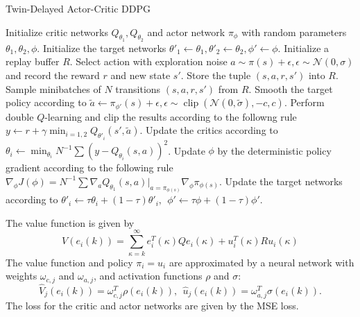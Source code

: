 \documentclass[landscape,a0paper,fontscale=0.292]{baposter}
\DeclareMathOperator{\Clip}{clip}
\begin{document}
\begin{poster}
{
	\begin{algorithm}[H]
		\caption{Twin-Delayed Actor-Critic DDPG}
		\begin{algorithmic}[1]
			\STATE Initialize critic networks $Q_{\theta_1}, Q_{\theta_2}$ and actor network $\pi_{\phi}$ with random parameters
			$\theta_1, \theta_2, \phi$. 
			\STATE Initialize the target networks $\theta'_1 \leftarrow \theta_1, \theta'_2 \leftarrow \theta_2, \phi' \leftarrow \phi$.
			\STATE Initialize a replay buffer $R$.
				\STATE Select action with exploration noise $a \sim \pi(s) + \epsilon, \epsilon \sim \mathcal{N}(0, \sigma)$ and record the reward $r$ and new state $s'$. 
				\STATE Store the tuple $(s, a, r, s')$ into $R$. 
				\STATE Sample minibatches of $N$ transitions $(s, a, r, s')$ from $R$.
				\STATE Smooth the target policy according to $\tilde{a} \leftarrow \pi_{\phi'}(s) + \epsilon, \epsilon \sim \Clip(\mathcal{N}(0, \tilde{\sigma}), -c, c)$.
				\STATE Perform double $Q$-learning and clip the results according to the followng rule $y \leftarrow r + \gamma \min_{i=1,2}Q_{\theta'_i}(s', \tilde{a})$. 
				\STATE Update the critics according to $\theta_i \leftarrow \min_{\theta_i}N^{-1}\sum(y - Q_{\theta_i}(s, a))^2$.
					\STATE Update $\phi$ by the deterministic policy gradient according to the following rule $\nabla_{\phi}J(\phi) = N^{-1}\sum\nabla_a Q_{\theta_1}(s,a)\big|_{a = \pi_{\phi(s)}}\nabla_{\phi}\pi_{\phi(s)}$.
					\STATE Update the target networks according to $\theta'_i \leftarrow \tau\theta_i + (1-\tau)\theta'_i, \:\: \phi' \leftarrow \tau\phi + (1-\tau)\phi'$.
				\ENDIF 
			\ENDFOR
		\end{algorithmic}	
	\end{algorithm}
	The value function is given by
	\begin{equation*}
	\displaystyle V(e_i(k)) = \sum\limits_{\kappa = k}^{\infty}{e_i^T(\kappa)Qe_i(\kappa) + u_i^T(\kappa)Ru_i(\kappa)}
	\end{equation*}
	The value function and policy $\pi_i = u_i$ are approximated by a neural network with weights $\omega_{c, j}$ and $\omega_{a,j}$, and activation functions $\rho$ and $\sigma$:
	\begin{equation*}
	\displaystyle \widehat{V}_j(e_i(k)) = \omega_{c, j}^T\rho(e_i(k)), \:\: \widehat{u}_j(e_i(k)) = \omega_{a,j}^T\sigma(e_i(k)).
	\end{equation*}
	The loss for the critic and actor networks are given by the MSE loss. 
}


\end{poster}
\end{document}
